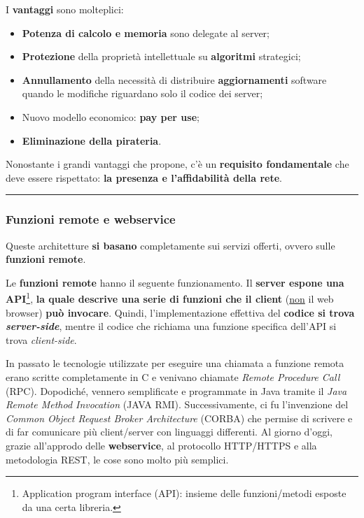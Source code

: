 \documentclass[a4paper]{article}
\newcommand{\longline}{\noindent\rule{\textwidth}{0.4pt}}
\begin{document}
	\noindent
	I \textcolor{Green4}{\textbf{vantaggi}} sono molteplici:
	\begin{itemize}
		\item \textbf{Potenza di calcolo e memoria} sono delegate al server;
		
		\item \textbf{Protezione} della proprietà intellettuale su \textbf{algoritmi} strategici;
		
		\item \textbf{Annullamento} della necessità di distribuire \textbf{aggiornamenti} software quando le modifiche riguardano solo il codice dei server;
		
		\item Nuovo modello economico: \textbf{pay per use};
		
		\item \textbf{Eliminazione della pirateria}.
	\end{itemize}
	Nonostante i grandi vantaggi che propone, c'è un \textbf{requisito fondamentale} che deve essere rispettato: \textbf{la presenza e l'affidabilità della rete}.
	
	\longline
	
	\subsubsection{Funzioni remote e webservice}
	
	\noindent
	Queste architetture \textbf{si basano} completamente sui servizi offerti, ovvero sulle \textbf{funzioni remote}.
	
	Le \textcolor{Red3}{\textbf{funzioni remote}} hanno il seguente funzionamento. Il \textbf{server espone una API}\footnote{Application program interface (API): insieme delle funzioni/metodi esposte da una certa libreria.}, \textbf{la quale descrive una serie di funzioni che il client} (\underline{non} il web browser) \textbf{può invocare}. Quindi, l'implementazione effettiva del \textbf{codice si trova \emph{server-side}}, mentre il codice che richiama una funzione specifica dell'API si trova \emph{client-side}.\newline
	
	\noindent
	In passato le tecnologie utilizzate per eseguire una chiamata a funzione remota erano scritte completamente in C e venivano chiamate \emph{Remote Procedure Call} (RPC). Dopodiché, vennero semplificate e programmate in Java tramite il \emph{Java Remote Method Invocation} (JAVA RMI). Successivamente, ci fu l'invenzione del \emph{Common Object Request Broker Architecture} (CORBA) che permise di scrivere e di far comunicare più client/server con linguaggi differenti.\newline
	Al giorno d'oggi, grazie all'approdo delle \textcolor{Red3}{\textbf{webservice}}, al protocollo HTTP/HTTPS e alla metodologia REST, le cose sono molto più semplici.
	
\end{document}
